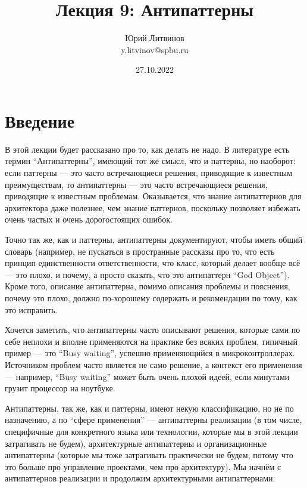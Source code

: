 \documentclass[a5paper]{article}
\title{Лекция 9: Антипаттерны}
\author{Юрий Литвинов\\\small{y.litvinov@spbu.ru}}
\date{27.10.2022}
\begin{document}
\maketitle
\thispagestyle{empty}

\section{Введение}

В этой лекции будет рассказано про то, как делать не надо. В литературе есть термин ``Антипаттерны'', имеющий тот же смысл, что и паттерны, но наоборот: если паттерны --- это часто встречающиеся решения, приводящие к известным преимуществам, то антипаттерны --- это часто встречающиеся решения, приводящие к известным проблемам. Оказывается, что знание антипаттернов для архитектора даже полезнее, чем знание паттернов, поскольку позволяет избежать очень частых и очень дорогостоящих ошибок.

Точно так же, как и паттерны, антипаттерны документируют, чтобы иметь общий словарь (например, не пускаться в пространные рассказы про то, что есть принцип единственности ответственности, что класс, который делает вообще всё --- это плохо, и почему, а просто сказать, что это антипаттерн ``God Object''). Кроме того, описание антипаттерна, помимо описания проблемы и пояснения, почему это плохо, должно по-хорошему содержать и рекомендации по тому, как это исправить. 

Хочется заметить, что антипаттерны часто описывают решения, которые сами по себе неплохи и вполне применяются на практике без всяких проблем, типичный пример --- это ``Busy waiting'', успешно применяющийся в микроконтроллерах. Источником проблем часто является не само решение, а контекст его применения --- например, ``Busy waiting'' может быть очень плохой идеей, если минутами грузит процессор на ноутбуке.

Антипаттерны, так же, как и паттерны, имеют некую классификацию, но не по назначению, а по ``сфере применения'' --- антипаттерны реализации (в том числе, специфичные для конкретного языка или технологии, которые мы в этой лекции затрагивать не будем), архитектурные антипаттерны и организационные антипаттерны (которые мы тоже затрагивать практически не будем, потому что это больше про управление проектами, чем про архитектуру). Мы начнём с антипаттернов реализации и продолжим архитектурными антипаттернами.
\end{document}
